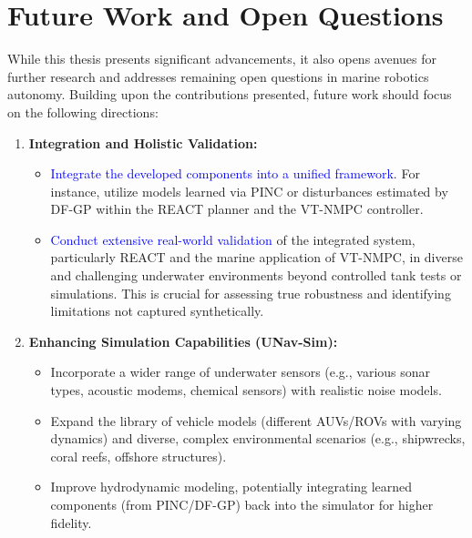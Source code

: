 \section{Future Work and Open Questions}
\label{sec:future_work}

While this thesis presents significant advancements, it also opens avenues for further research and addresses remaining open questions in marine robotics autonomy. Building upon the contributions presented, future work should focus on the following directions:

\begin{enumerate}
    \item \textbf{Integration and Holistic Validation:}
        \begin{itemize}
            \item \textcolor{blue}{Integrate the developed components into a unified framework.} For instance, utilize models learned via PINC or disturbances estimated by DF-GP within the REACT planner and the VT-NMPC controller.
            \item \textcolor{blue}{Conduct extensive real-world validation} of the integrated system, particularly REACT and the marine application of VT-NMPC, in diverse and challenging underwater environments beyond controlled tank tests or simulations. This is crucial for assessing true robustness and identifying limitations not captured synthetically.
        \end{itemize}

    \item \textbf{Enhancing Simulation Capabilities (UNav-Sim):}
        \begin{itemize}
            \item Incorporate a wider range of underwater sensors (e.g., various sonar types, acoustic modems, chemical sensors) with realistic noise models.
            \item Expand the library of vehicle models (different \acp{AUV}/\acp{ROV} with varying dynamics) and diverse, complex environmental scenarios (e.g., shipwrecks, coral reefs, offshore structures).
            \item Improve hydrodynamic modeling, potentially integrating learned components (from PINC/DF-GP) back into the simulator for higher fidelity.
        \end{itemize}


\end{enumerate}
